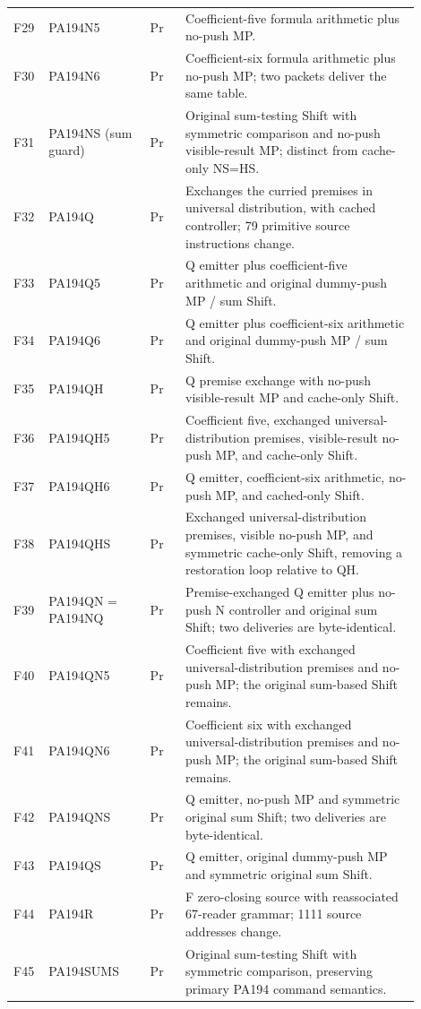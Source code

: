 \begin{longtable}{@{}p{0.055\linewidth}p{0.235\linewidth}p{0.08\linewidth}p{0.535\linewidth}@{}}
F29 & PA194N5 & Pr & Coefficient-five formula arithmetic plus no-push MP. \\
F30 & PA194N6 & Pr & Coefficient-six formula arithmetic plus no-push MP; two packets deliver the same table. \\
F31 & PA194NS (sum guard) & Pr & Original sum-testing Shift with symmetric comparison and no-push visible-result MP; distinct from cache-only NS=HS. \\
F32 & PA194Q & Pr & Exchanges the curried premises in universal distribution, with cached controller; 79 primitive source instructions change. \\
F33 & PA194Q5 & Pr & Q emitter plus coefficient-five arithmetic and original dummy-push MP / sum Shift. \\
F34 & PA194Q6 & Pr & Q emitter plus coefficient-six arithmetic and original dummy-push MP / sum Shift. \\
F35 & PA194QH & Pr & Q premise exchange with no-push visible-result MP and cache-only Shift. \\
F36 & PA194QH5 & Pr & Coefficient five, exchanged universal-distribution premises, visible-result no-push MP, and cache-only Shift. \\
F37 & PA194QH6 & Pr & Q emitter, coefficient-six arithmetic, no-push MP, and cached-only Shift. \\
F38 & PA194QHS & Pr & Exchanged universal-distribution premises, visible no-push MP, and symmetric cache-only Shift, removing a restoration loop relative to QH. \\
F39 & PA194QN = PA194NQ & Pr & Premise-exchanged Q emitter plus no-push N controller and original sum Shift; two deliveries are byte-identical. \\
F40 & PA194QN5 & Pr & Coefficient five with exchanged universal-distribution premises and no-push MP; the original sum-based Shift remains. \\
F41 & PA194QN6 & Pr & Coefficient six with exchanged universal-distribution premises and no-push MP; the original sum-based Shift remains. \\
F42 & PA194QNS & Pr & Q emitter, no-push MP and symmetric original sum Shift; two deliveries are byte-identical. \\
F43 & PA194QS & Pr & Q emitter, original dummy-push MP and symmetric original sum Shift. \\
F44 & PA194R & Pr & F zero-closing source with reassociated 67-reader grammar; 1111 source addresses change. \\
F45 & PA194SUMS & Pr & Original sum-testing Shift with symmetric comparison, preserving primary PA194 command semantics. \\

\end{longtable}
